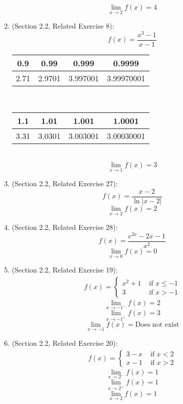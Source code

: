 \documentclass{article}
\begin{document}
\begin{enumerate}
	    $$\lim_{x \to 2}{f(x)} = 4$$
    \item (Section 2.2, Related Exercise 8):
	    $$f(x) = \frac{x^3 - 1}{x - 1}$$
    
	    \begin{tabular}{| c | c | c | c |}
            \hline
	        0.9 & 0.99 & 0.999 & 0.9999 \\
            \hline
	        2.71 & 2.9701 & 3.997001 & 3.99970001 \\
            \hline
        \end{tabular} \\
    
	    \begin{tabular}{| c | c | c | c |}
            \hline
	        1.1 & 1.01 & 1.001 & 1.0001 \\
            \hline
	        3.31 & 3.0301 & 3.003001 & 3.00030001 \\
            \hline
        \end{tabular} \\
    
	    $$\lim_{x \to 1}{f(x)} = 3$$
    \item (Section 2.2, Related Exercise 27):
	    $$f(x) = \frac{x-2}{\ln|x-2|}$$
	    $$\lim_{x \to 2}{f(x)} = 2$$
    \item (Section 2.2, Related Exercise 28):
	    $$f(x) = \frac{e^{2x} - 2x - 1}{x^2}$$
	    $$\lim_{x \to 0}{f(x)} = 0$$
    \item (Section 2.2, Related Exercise 19):
	    $$\begin{aligned}f(x) = \begin{cases}
	    x^2 + 1 &\text{ if } x \leq -1 \\
	    3 &\text{ if } x > -1
	    \end{cases}\end{aligned}$$
		$$\lim_{x \to -1^-}{f(x)} = 2$$
		$$\lim_{x \to -1^+}{f(x)} = 3$$
		$$\lim_{x \to -1}{f(x)} = \text{Does not exist}$$
    \item (Section 2.2, Related Exercise 20):
	    $$\begin{aligned}f(x) = \begin{cases}
	    3 - x &\text{ if } x < 2 \\
	    x - 1 &\text{ if } x >2
	    \end{cases}\end{aligned}$$
	    $$\lim_{x \to 2^-}{f(x)} = 1$$
	    $$\lim_{x \to 2^+}{f(x)} = 1$$
	    $$\lim_{x \to 2}{f(x)} = 1$$


\end{enumerate}
\end{document}

